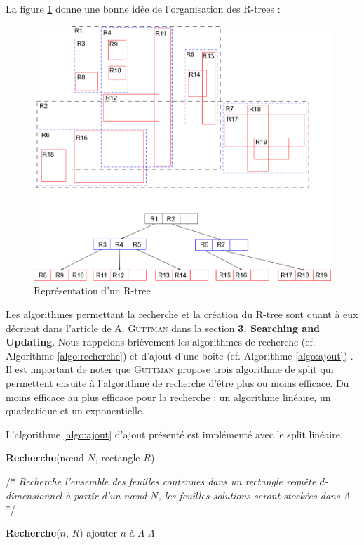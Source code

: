 La figure \ref{fig:rtree} donne une bonne idée de l'organisation des R-trees :
\begin{figure}[htbp]
\centering
\includegraphics[scale=0.50]{img/rtree}
\caption{Représentation d'un R-tree\cite{wiki}}
\label{fig:rtree}
\end{figure}

Les algorithmes permettant la recherche et la création du R-tree sont quant à eux décrient dans l'article de \textsc{A. Guttman} dans la section \textbf{3. Searching and Updating}\cite{Guttman}. Nous rappelons brièvement les algorithmes de recherche (cf. Algorithme \ref{algo:recherche}) et d'ajout d'une boîte (cf. Algorithme \ref{algo:ajout}) \cite{poulos}. Il est important de noter que \textsc{Guttman} propose trois algorithme de \og split \fg{} qui permettent ensuite à l'algorithme de recherche d'être plus  ou moins efficace. Du moins efficace au plus efficace pour la recherche : un algorithme linéaire, un quadratique et un exponentielle.

L'algorithme \ref{algo:ajout} d'ajout présenté est implémenté avec le split linéaire.

\begin{algorithm}
\caption{\textbf{Recherche}(nœud $N$, rectangle $R$)}
/* \textit{Recherche l'ensemble des feuilles contenues dans un rectangle requête $d$-dimensionnel à partir d'un nœud $N$, les feuilles solutions seront stockées dans $\Lambda$} */
\label{algo:recherche}
\begin{algorithmic}[1]
    \STATE \textbf{Recherche}($n$, $R$)
  \ENDFOR
{}%
    \STATE ajouter $n$ à $\Lambda$
  \ENDFOR
\ENDIF
\RETURN $\Lambda$
\end{algorithmic}
\end{algorithm}

